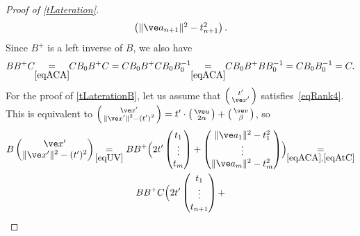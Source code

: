 \documentclass[reqno]{amsart}
\begin{document}
\begin{proof}[Proof of \cref{tLateration}]
\begin{equation}
\begin{pmatrix}
      \lVert\ve a_{n+1}\rVert^2 - t_{n+1}^2
    \end{pmatrix}.
  \end{equation}
  Since $B^+$ is a left inverse of $B$, we also have
  \begin{equation} \label{eqAAC}%
    B B^+ C \!\!\underset{\eqref{eqACA}}{=}\!\! C B_0 B^+ C = C B_0
    B^+ C B_0 B_0^{-1} \!\!\underset{\eqref{eqACA}}{=}\!\! C B_0 B^+ B
    B_0^{-1} = C B_0 B_0^{-1} = C.
  \end{equation}
  For the proof of \cref{tLaterationB}, let us assume that
  $\left(\begin{smallmatrix} t' \\ \ve x'\end{smallmatrix}\right)$
  satisfies~\eqref{eqRank4}. This is equivalent to
  $\left(\begin{smallmatrix} \ve x' \\ \lVert\ve x'\rVert^2 -
      (t')^2 \end{smallmatrix}\right) = t' \cdot
  \left(\begin{smallmatrix} \ve u \\ 2 \alpha \end{smallmatrix}\right)
  + \left(\begin{smallmatrix} \ve v \\
      \beta \end{smallmatrix}\right)$, so
  \begin{multline*}
    B
    \begin{pmatrix}
      \ve x' \\ \lVert\ve x'\rVert^2 - (t')^2
    \end{pmatrix} \!\underset{\eqref{eqUV}}{=} B B^+
    \Bigl(2 t'
    \begin{pmatrix}
      t_1 \\ \vdots \\ t_m
    \end{pmatrix} +
    \begin{pmatrix}
      \lVert\ve a_1\rVert^2 - t_1^2 \\
      \vdots \\
      \lVert\ve a_m\rVert^2 - t_m^2
    \end{pmatrix}\Bigr)
    \!\!\underset{\eqref{eqACA},\eqref{eqAtC}}{=} \\
    B B^+ C \Bigl(2 t'
    \begin{pmatrix}
      t_1 \\ \vdots \\ t_{n+1}
    \end{pmatrix} +

\end{multline*}
\end{proof}
\end{document}
